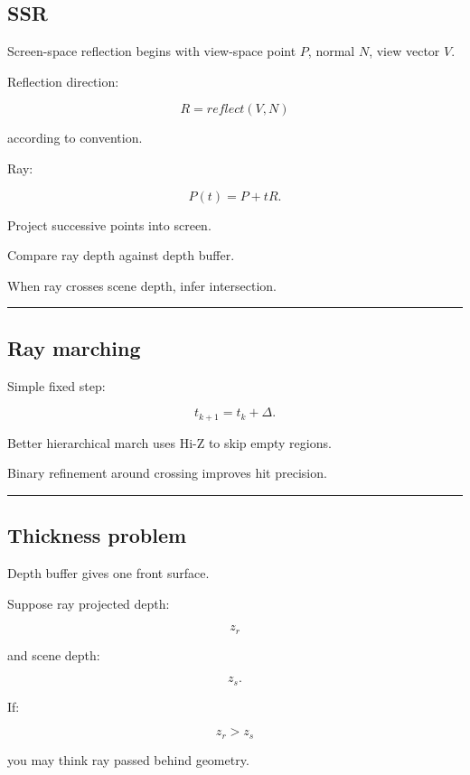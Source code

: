 \subsection{SSR}\label{04-visual-computing-ii-ch040-ssr}

Screen-space reflection begins with view-space point \(P\), normal \(N\), view vector \(V\).

Reflection direction:

\[
R=
reflect(V,N)
\]

according to convention.

Ray:

\[
P(t)=P+tR.
\]

Project successive points into screen.

Compare ray depth against depth buffer.

When ray crosses scene depth, infer intersection.

\begin{center}\rule{0.5\linewidth}{0.5pt}\end{center}

\subsection{Ray marching}\label{04-visual-computing-ii-ch040-ray-marching}

Simple fixed step:

\[
t_{k+1}=t_k+\Delta.
\]

Better hierarchical march uses Hi-Z to skip empty regions.

Binary refinement around crossing improves hit precision.

\begin{center}\rule{0.5\linewidth}{0.5pt}\end{center}

\subsection{Thickness problem}\label{04-visual-computing-ii-ch040-thickness-problem}

Depth buffer gives one front surface.

Suppose ray projected depth:

\[
z_r
\]

and scene depth:

\[
z_s.
\]

If:

\[
z_r>z_s
\]

you may think ray passed behind geometry.

